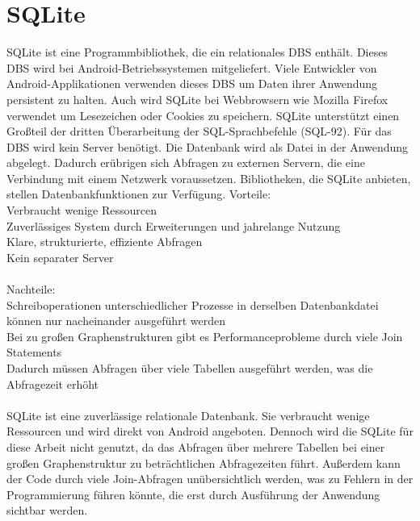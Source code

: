 \section{SQLite}
SQLite ist eine Programmbibliothek, die ein relationales DBS enthält.
Dieses DBS wird bei Android-Betriebssystemen mitgeliefert. Viele
Entwickler von Android-Applikationen verwenden dieses DBS um
Daten ihrer Anwendung persistent zu halten. Auch wird SQLite bei
Webbrowsern wie Mozilla Firefox verwendet um Lesezeichen oder
Cookies zu speichern. SQLite unterstützt einen Großteil der dritten
Überarbeitung der SQL-Sprachbefehle (SQL-92). Für das DBS wird
kein Server benötigt. Die Datenbank wird als Datei in der Anwendung
abgelegt. Dadurch erübrigen sich Abfragen zu externen Servern, die
eine Verbindung mit einem Netzwerk voraussetzen. Bibliotheken, die
SQLite anbieten, stellen Datenbankfunktionen zur Verfügung.
Vorteile:\\
Verbraucht wenige Ressourcen\\
Zuverlässiges System durch Erweiterungen und jahrelange Nutzung\\
Klare, strukturierte, effiziente Abfragen\\
Kein separater Server\\\\
Nachteile: \\
Schreiboperationen unterschiedlicher Prozesse in derselben Datenbankdatei können nur nacheinander ausgeführt werden\\
Bei zu großen Graphenstrukturen gibt es Performanceprobleme durch viele Join Statements\\
Dadurch müssen Abfragen über viele Tabellen ausgeführt werden, was die Abfragezeit erhöht\\\\
SQLite ist eine zuverlässige relationale Datenbank. Sie verbraucht wenige Ressourcen und wird direkt von Android angeboten. Dennoch wird die SQLite für diese Arbeit nicht genutzt, da das Abfragen über mehrere Tabellen bei einer großen Graphenstruktur zu beträchtlichen Abfragezeiten führt. Außerdem kann der Code durch viele Join-Abfragen unübersichtlich werden, was zu Fehlern in der Programmierung führen könnte, die erst durch Ausführung der Anwendung sichtbar werden.





